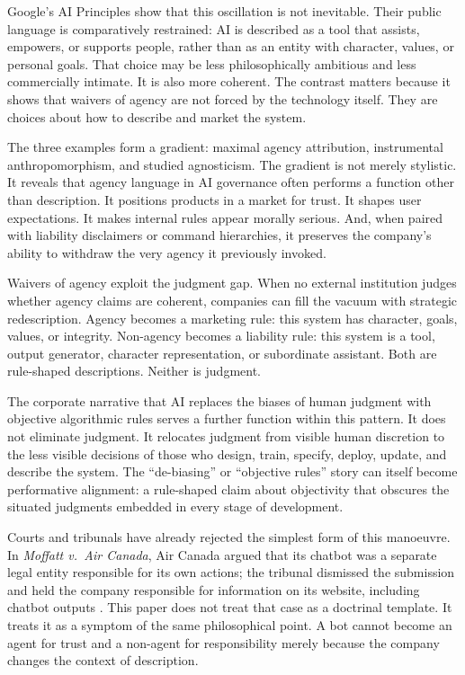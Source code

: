 \documentclass[11pt,a4paper]{article}
\begin{document}
Google's AI Principles show that this oscillation is not inevitable. Their public language is comparatively restrained: AI is described as a tool that assists, empowers, or supports people, rather than as an entity with character, values, or personal goals. That choice may be less philosophically ambitious and less commercially intimate. It is also more coherent. The contrast matters because it shows that waivers of agency are not forced by the technology itself. They are choices about how to describe and market the system.

The three examples form a gradient: maximal agency attribution, instrumental anthropomorphism, and studied agnosticism. The gradient is not merely stylistic. It reveals that agency language in AI governance often performs a function other than description. It positions products in a market for trust. It shapes user expectations. It makes internal rules appear morally serious. And, when paired with liability disclaimers or command hierarchies, it preserves the company's ability to withdraw the very agency it previously invoked.

Waivers of agency exploit the judgment gap. When no external institution judges whether agency claims are coherent, companies can fill the vacuum with strategic redescription. Agency becomes a marketing rule: this system has character, goals, values, or integrity. Non-agency becomes a liability rule: this system is a tool, output generator, character representation, or subordinate assistant. Both are rule-shaped descriptions. Neither is judgment.

The corporate narrative that AI replaces the biases of human judgment with objective algorithmic rules serves a further function within this pattern. It does not eliminate judgment. It relocates judgment from visible human discretion to the less visible decisions of those who design, train, specify, deploy, update, and describe the system. The ``de-biasing'' or ``objective rules'' story can itself become performative alignment: a rule-shaped claim about objectivity that obscures the situated judgments embedded in every stage of development.

Courts and tribunals have already rejected the simplest form of this manoeuvre. In \emph{Moffatt v.\ Air Canada}, Air Canada argued that its chatbot was a separate legal entity responsible for its own actions; the tribunal dismissed the submission and held the company responsible for information on its website, including chatbot outputs \citep{moffatt2024aircanada}. This paper does not treat that case as a doctrinal template. It treats it as a symptom of the same philosophical point. A bot cannot become an agent for trust and a non-agent for responsibility merely because the company changes the context of description.
\end{document}
